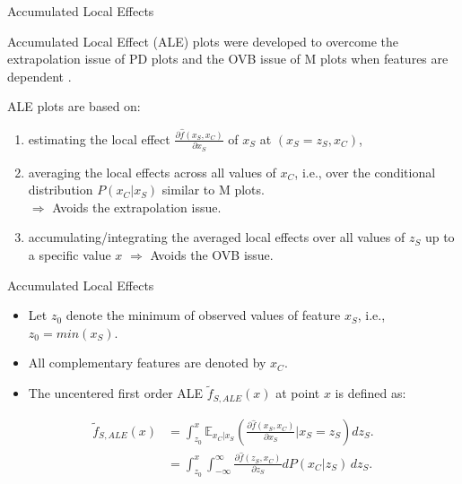 \documentclass[aspectratio=169]{../latex_main/tntbeamer}  %
\begin{document}
\begin{frame}{Accumulated Local Effects}

Accumulated Local Effect (ALE) plots were developed to overcome the extrapolation issue of PD plots and the OVB issue of M plots when features are dependent .

\pause
\medskip
ALE plots are based on:
\begin{enumerate}
\item estimating the local effect $\frac{\partial \hat{f}(x_S, x_C)}{\partial x_S}$ of $x_S$ at $(x_S = z_S, x_C)$,
\pause
\item averaging the local effects across all values of $x_C$, i.e., over the conditional distribution $P(x_C|x_S)$ similar to M plots.\\
$\Rightarrow$ Avoids the extrapolation issue.
\pause
\item accumulating/integrating the averaged local effects over all values of $z_S$ up to a specific value $x$ $\Rightarrow$ Avoids the OVB issue.
\end{enumerate}

\end{frame}


\begin{frame}{Accumulated Local Effects}

\begin{itemize}
    \item Let $z_0$ denote the minimum of observed values of feature $x_S$, i.e., $z_0 = min(x_S)$.
    \item All complementary features are denoted by $x_C$.
    \item The uncentered first order ALE $\tilde{f}_{S, ALE}(x)$ at point $x$ is defined as:
\end{itemize}

$$
\begin{aligned}
\tilde{f}_{S, ALE}(x) &= \int_{z_{0}}^{x} \mathbb{E}_{x_C \vert x_S} \left(\frac{\partial \hat{f}(x_S, x_C)}{\partial x_S} \bigg \vert x_S = z_S \right) dz_S. \\
&= \int_{z_{0}}^{x} \int_{-\infty}^{\infty}  \frac{\partial \hat{f}(z_S, x_C)}{\partial z_S} d P(x_C | z_S) \, dz_S.
\end{aligned}
$$

\end{frame}
\end{document}
